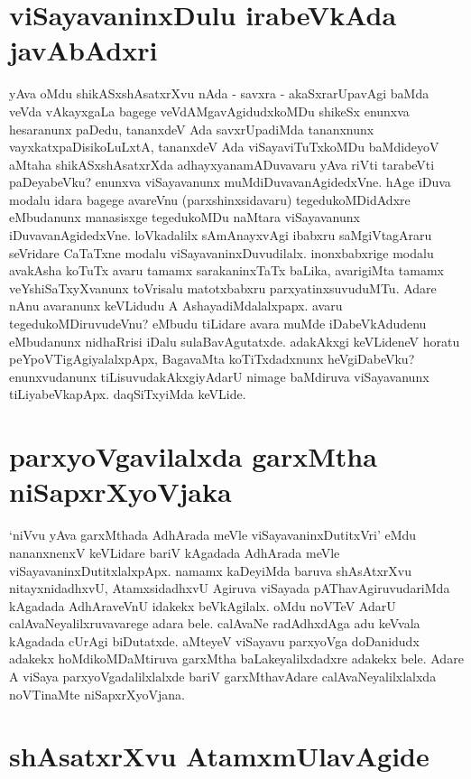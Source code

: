 \section*{viSayavaninxDulu irabeVkAda javAbAdxri}

yAva  oMdu shikASxshAsatxrXvu nAda - savxra - akaSxrarUpavAgi baMda veVda vAkayxgaLa bagege veVdAMgavAgidudxkoMDu shikeSx  enunxva hesaranunx  paDedu, tananxdeV Ada savxrUpadiMda tananxnunx vayxkatxpaDisikoLuLxtA, tananxdeV Ada viSayaviTuTxkoMDu baMdideyoV aMtaha shikASxshAsatxrXda adhayxyanamADuvavaru yAva riVti tarabeVti paDeyabeVku?  enunxva viSayavanunx muMdiDuvavanAgidedxVne. hAge iDuva modalu idara bagege avareVnu (parxshinxsidavaru) tegedukoMDidAdxre eMbudanunx  manasisxge tegedukoMDu naMtara viSayavanunx iDuvavanAgidedxVne. loVkadalilx  sAmAnayxvAgi ibabxru saMgiVtagAraru seVridare CaTaTxne modalu viSayavaninxDuvudilalx. inonxbabxrige modalu avakAsha koTuTx avaru tamamx sarakaninxTaTx baLika, avarigiMta tamamx veYshiSaTxyXvanunx  toVrisalu matotxbabxru parxyatinxsuvuduMTu. Adare nAnu avaranunx  keVLidudu A AshayadiMdalalxpapx. avaru tegedukoMDiruvudeVnu? eMbudu tiLidare avara muMde iDabeVkAdudenu eMbudanunx nidhaRrisi iDalu sulaBavAgutatxde. adakAkxgi keVLideneV horatu peYpoVTigAgiyalalxpApx, BagavaMta koTiTxdadxnunx  heVgiDabeVku? enunxvudanunx  tiLisuvudakAkxgiyAdarU nimage baMdiruva viSayavanunx  tiLiyabeVkapApx. daqSiTxyiMda keVLide.

\section*{parxyoVgavilalxda garxMtha niSapxrXyoVjaka}

`niVvu  yAva garxMthada AdhArada meVle viSayavaninxDutitxVri' eMdu nananxnenxV keVLidare bariV kAgadada AdhArada meVle viSayavaninxDutitxlalxpApx. namamx  kaDeyiMda baruva shAsAtxrXvu  nitayxnidadhxvU, AtamxsidadhxvU Agiruva viSayada pAThavAgiruvudariMda kAgadada AdhAraveVnU idakekx  beVkAgilalx. oMdu noVTeV AdarU calAvaNeyalilxruvavarege adara bele. calAvaNe radAdhxdAga adu keVvala kAgadada cUrAgi biDutatxde. aMteyeV viSayavu  parxyoVga doDanidudx  adakekx  hoMdikoMDaMtiruva garxMtha  baLakeyalilxdadxre adakekx  bele.  Adare A viSaya parxyoVgadalilxlalxde bariV garxMthavAdare  calAvaNeyalilxlalxda noVTinaMte  niSapxrXyoVjana.

\section*{shAsatxrXvu  AtamxmUlavAgide}

